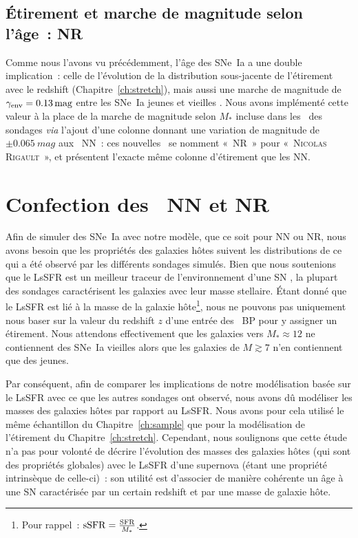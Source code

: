 \documentclass[../main/main.tex]{subfiles}
\begin{document}
\subsection{Étirement et marche de magnitude selon l'âge~: NR}\label{ssec:nr}

Comme nous l'avons vu précédemment, l'âge des SNe~Ia a une double implication~:
celle de l'évolution de la distribution sous-jacente de l'étirement avec le
redshift (Chapitre~\ref{ch:stretch}), mais aussi une marche de magnitude de
$\gamma_{\rm env} = \SI{0,13}{mag}$ entre les SNe~Ia jeunes et vieilles
\citep[Chapitre~\ref{ch:stretch},][]{rigault2020}. Nous avons implémenté cette
valeur à la place de la marche de magnitude selon $M_*$ incluse dans les
\wgtmap\ des sondages \textit{via} l'ajout d'une colonne donnant une variation
de magnitude de $\pm\SI{0.065}{mag}$ aux \hostlib\ NN~: ces nouvelles \hostlib\
se nomment «~NR~» pour «~\textsc{Nicolas} \textsc{Rigault}~», et présentent
l'exacte même colonne d'étirement que les NN.

\section{Confection des \hostlib\ NN et NR}\label{sec:hmake}

Afin de simuler des SNe~Ia avec notre modèle, que ce soit pour NN ou NR, nous
avons besoin que les propriétés des galaxies hôtes suivent les distributions de
ce qui a été observé par les différents sondages simulés. Bien que nous
soutenions que le LsSFR est un meilleur traceur de l'environnement d'une SN
\citep{briday2022}, la plupart des sondages caractérisent les galaxies avec leur
masse stellaire. Étant donné que le LsSFR est lié à la masse de la galaxie
hôte\footnote{Pour rappel~: $\mathrm{sSFR} = \frac{\rm SFR}{M_*}$.}, nous ne
pouvons pas uniquement nous baser sur la valeur du redshift $z$ d'une entrée des
\hostlib\ BP pour y assigner un étirement. Nous attendons effectivement que les
galaxies vers $M_*\approx12$ ne contiennent des SNe~Ia vieilles  alors que les
galaxies de $M \gtrsim 7$ n'en contiennent que des jeunes.

Par conséquent, afin de comparer les implications de notre modélisation basée
sur le LsSFR avec ce que les autres sondages ont observé, nous avons dû
modéliser les masses des galaxies hôtes par rapport au LsSFR. Nous avons pour
cela utilisé le même échantillon du Chapitre~\ref{ch:sample} que pour la
modélisation de l'étirement du Chapitre~\ref{ch:stretch}. Cependant, nous
soulignons que cette étude n'a pas pour volonté de décrire l'évolution des
masses des galaxies hôtes (qui sont des propriétés globales) avec le LsSFR d'une
supernova (étant une propriété intrinsèque de celle-ci)~: son utilité est
d'associer de manière cohérente un âge à une SN caractérisée par un certain
redshift et par une masse de galaxie hôte.
\end{document}
